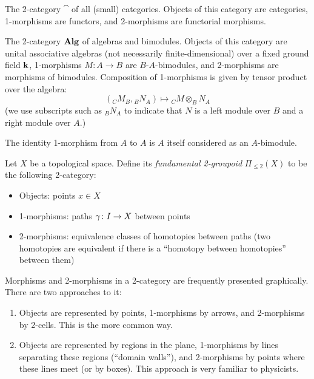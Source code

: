 \begin{example}\label{x:cat}
  The 2-category $\cat$ of all (small) categories. Objects of this category are
  categories, 1-morphisms are functors, and 2-morphisms are functorial
  morphisms.
\end{example}
\begin{example} \label{x:alg}
  The 2-category $\mathbf{Alg}$ of algebras and bimodules. Objects of this category are
  unital associative algebras (not necessarily finite-dimensional) over a fixed
  ground field $\mathbf{k}$, 1-morphisms $M\colon A\to B$ are $B$-$A$-bimodules,
  and 2-morphisms are morphisms of bimodules. Composition of 1-morphisms
  is given by tensor product over the algebra:
  $$
  ({}_CM_B, {}_BN_A)\mapsto {}_C M\otimes_B N_A
  $$
  (we use subscripts such as ${}_BN_A$ to indicate that $N$ is a left module
  over $B$ and a right module over $A$.)

  The identity 1-morphism from $A$ to $A$ is $A$ itself considered as an
  $A$-bimodule.
\end{example}
\begin{example} \label{x:2groupoid}
  Let $X$ be a topological space. Define its \emph{fundamental
  2-groupoid} $\Pi_{\leq 2}(X)$ to be the
  following 2-category:
  \begin{itemize}
    \item Objects: points $x\in X$
    \item 1-morphisms: paths $\gamma\colon I \to X$ between points
    \item 2-morphisms: equivalence classes of homotopies between paths
          (two homotopies are equivalent if there is a ``homotopy between
          homotopies'' between them)
  \end{itemize}
\end{example}

Morphisms and 2-morphisms in a 2-category are frequently presented graphically.
There are two approaches to it:
\begin{enumerate}
  \item Objects are represented by points, 1-morphisms by arrows,
    and 2-morphisms by 2-cells. This is the more common way.

  \item Objects are represented by regions in the plane, 1-morphisms by lines
    separating these regions (``domain walls''),
    and 2-morphisms by points where these lines meet (or by boxes).
    This approach is very familiar to physicists.
\end{enumerate}

